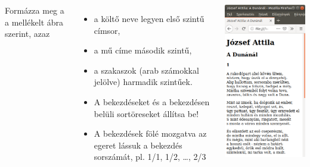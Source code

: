 \documentclass[usenames,dvipsnames,aspectratio=169]{beamer}
\begin{document}
\begin{frame}
  \begin{columns}[c]
      Formázza meg a  a mellékelt ábra szerint, azaz
      \begin{itemize}
        \item a költő neve legyen első szintű címsor, 
        \item a mű címe második szintű,
        \item a szakaszok (arab számokkal jelölve) harmadik szintűek.
        \item A bekezdéseket és a bekezdésen belüli sortöreseket állítsa be!
        \item A bekezdések fölé mozgatva az egeret lássuk a bekezdés sorszámát, pl. 1/1, 1/2, \dots, 2/3
      \end{itemize}
      \begin{center}
        \begin{exampleblock}{}
          \centering \includegraphics[scale=.2]{attila.png}
        \end{exampleblock}
      \end{center}
  \end{columns}
\end{frame}
\end{document}
